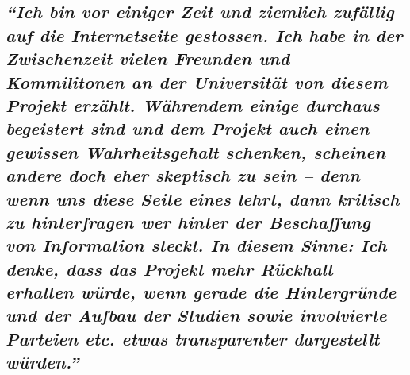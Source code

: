 \hypertarget{ich-bin-vor-einiger-zeit-und-ziemlich-zufuxe4llig-auf-die-internetseite-gestossen-ich-habe-in-der-zwischenzeit-vielen-freunden-und-kommilitonen-an-der-universituxe4t-von-diesem-projekt-erzuxe4hlt-wuxe4hrendem-einige-durchaus-begeistert-sind-und-dem-projekt-auch-einen-gewissen-wahrheitsgehalt-schenken-scheinen-andere-doch-eher-skeptisch-zu-sein--denn-wenn-uns-diese-seite-eines-lehrt-dann-kritisch-zu-hinterfragen-wer-hinter-der-beschaffung-von-information-steckt-in-diesem-sinne-ich-denke-dass-das-projekt-mehr-ruxfcckhalt-erhalten-wuxfcrde-wenn-gerade-die-hintergruxfcnde-und-der-aufbau-der-studien-sowie-involvierte-parteien-etc-etwas-transparenter-dargestellt-wuxfcrden}{%
\subsection{\texorpdfstring{\emph{``Ich bin vor einiger Zeit und
ziemlich zufällig auf die Internetseite gestossen. Ich habe in der
Zwischenzeit vielen Freunden und Kommilitonen an der Universität von
diesem Projekt erzählt. Währendem einige durchaus begeistert sind und
dem Projekt auch einen gewissen Wahr­heits­gehalt schenken, scheinen
andere doch eher skeptisch zu sein -- denn wenn uns diese Seite eines
lehrt, dann kritisch zu hinterfragen wer hinter der Beschaffung von
Information steckt. In diesem Sinne: Ich denke, dass das Projekt mehr
Rückhalt erhalten würde, wenn gerade die Hintergründe und der Aufbau der
Studien sowie involvierte Parteien etc. etwas transparenter dargestellt
würden.''}}{``Ich bin vor einiger Zeit und ziemlich zufällig auf die Internetseite gestossen. Ich habe in der Zwischenzeit vielen Freunden und Kommilitonen an der Universität von diesem Projekt erzählt. Währendem einige durchaus begeistert sind und dem Projekt auch einen gewissen Wahr­heits­gehalt schenken, scheinen andere doch eher skeptisch zu sein -- denn wenn uns diese Seite eines lehrt, dann kritisch zu hinterfragen wer hinter der Beschaffung von Information steckt. In diesem Sinne: Ich denke, dass das Projekt mehr Rückhalt erhalten würde, wenn gerade die Hintergründe und der Aufbau der Studien sowie involvierte Parteien etc. etwas transparenter dargestellt würden.''}}\label{ich-bin-vor-einiger-zeit-und-ziemlich-zufuxe4llig-auf-die-internetseite-gestossen-ich-habe-in-der-zwischenzeit-vielen-freunden-und-kommilitonen-an-der-universituxe4t-von-diesem-projekt-erzuxe4hlt-wuxe4hrendem-einige-durchaus-begeistert-sind-und-dem-projekt-auch-einen-gewissen-wahrheitsgehalt-schenken-scheinen-andere-doch-eher-skeptisch-zu-sein--denn-wenn-uns-diese-seite-eines-lehrt-dann-kritisch-zu-hinterfragen-wer-hinter-der-beschaffung-von-information-steckt-in-diesem-sinne-ich-denke-dass-das-projekt-mehr-ruxfcckhalt-erhalten-wuxfcrde-wenn-gerade-die-hintergruxfcnde-und-der-aufbau-der-studien-sowie-involvierte-parteien-etc-etwas-transparenter-dargestellt-wuxfcrden}}

